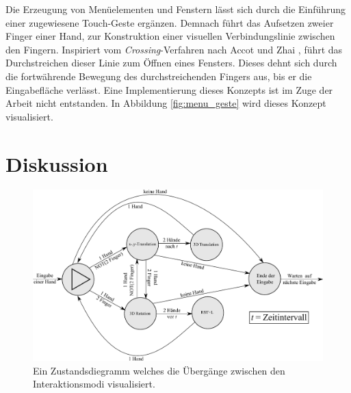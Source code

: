 Die Erzeugung von Menüelementen und Fenstern lässt sich durch die \linebreak Einführung einer zugewiesene Touch-Geste ergänzen. Demnach führt das Aufsetzen zweier Finger einer Hand, zur Konstruktion einer visuellen Verbindungslinie zwischen den Fingern. Inspiriert vom \emph{Crossing}-Verfahren nach Accot und Zhai \cite{accot:2002}, führt das Durchstreichen dieser Linie zum Öffnen eines Fensters. Dieses dehnt sich durch die fortwährende Bewegung des durchstreichenden Fingers aus, bis er die Eingabefläche verlässt. Eine Implementierung dieses Konzepts ist im Zuge der Arbeit nicht entstanden. In Abbildung \ref{fig:menu_geste} wird dieses Konzept visualisiert.


\section{Diskussion}
\label{sec:diskussion_wechsel}

\begin{figure}
	\begin{center}
		\includegraphics[width=12cm]{img/zustandsdiagramm.pdf}
	\end{center}
	\caption{Ein Zustandsdiegramm welches die Übergänge zwischen den Interaktionsmodi visualisiert.}
	\label{fig:zustandsdiagramm}
\end{figure}

